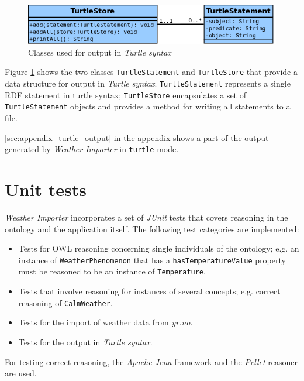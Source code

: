 \begin{figure}
\centering
\includegraphics[width=.7\textwidth]{figures/diagrams/turtlestore.png}
\caption{Classes used for output in \emph{Turtle syntax}}
\label{fig:importer_turtlestore}
\end{figure}

Figure \ref{fig:importer_turtlestore} shows the two classes \texttt{TurtleStatement} and \texttt{TurtleStore} that provide a data structure for output in \emph{Turtle syntax}. \texttt{TurtleStatement} represents a single RDF statement in turtle syntax; \texttt{TurtleStore} encapsulates a set of \texttt{TurtleStatement} objects and provides a method for writing all statements to a file.

\ref{sec:appendix_turtle_output} in the appendix shows a part of the output generated by \emph{Weather Importer} in \texttt{turtle} mode.

\section{Unit tests}
\label{sec:importer_tests}

\emph{Weather Importer} incorporates a set of \emph{JUnit} tests that covers reasoning in the \thinkhomeweather ontology and the application itself. The following test categories are implemented:
\begin{itemize}
  \item Tests for OWL reasoning concerning single individuals of the ontology; e.g. an instance of \texttt{WeatherPhenomenon} that has a \texttt{hasTemperatureValue} property must be reasoned to be an instance of \texttt{Temperature}.
  \item Tests that involve reasoning for instances of several concepts; e.g. correct reasoning of \texttt{CalmWeather}.
  \item Tests for the import of weather data from \emph{yr.no}.
  \item Tests for the output in \emph{Turtle syntax}.
\end{itemize}


For testing correct reasoning, the \emph{Apache Jena} framework and the \emph{Pellet} reasoner are used.
